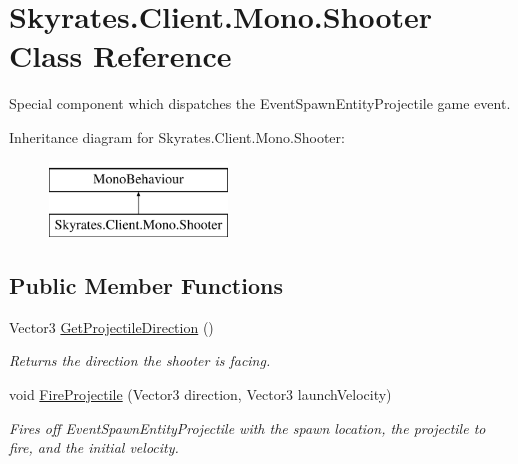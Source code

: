 \hypertarget{class_skyrates_1_1_client_1_1_mono_1_1_shooter}{\section{Skyrates.\-Client.\-Mono.\-Shooter Class Reference}
\label{class_skyrates_1_1_client_1_1_mono_1_1_shooter}
}


Special component which dispatches the Event\-Spawn\-Entity\-Projectile game event.  


Inheritance diagram for Skyrates.\-Client.\-Mono.\-Shooter\-:\begin{figure}[H]
\begin{center}
\leavevmode
\includegraphics[height=2.000000cm]{class_skyrates_1_1_client_1_1_mono_1_1_shooter}
\end{center}
\end{figure}
\subsection*{Public Member Functions}
\begin{DoxyCompactItemize}
\item 
Vector3 \hyperlink{class_skyrates_1_1_client_1_1_mono_1_1_shooter_a03537e4a716f50d4d294946088264b8e}{Get\-Projectile\-Direction} ()
\begin{DoxyCompactList}\small\item\em Returns the direction the shooter is facing. \end{DoxyCompactList}\item 
void \hyperlink{class_skyrates_1_1_client_1_1_mono_1_1_shooter_a334e64c05053fd401fa8423e11ad9dd9}{Fire\-Projectile} (Vector3 direction, Vector3 launch\-Velocity)
\begin{DoxyCompactList}\small\item\em Fires off Event\-Spawn\-Entity\-Projectile with the spawn location, the projectile to fire, and the initial velocity. \end{DoxyCompactList}\end{DoxyCompactItemize}
